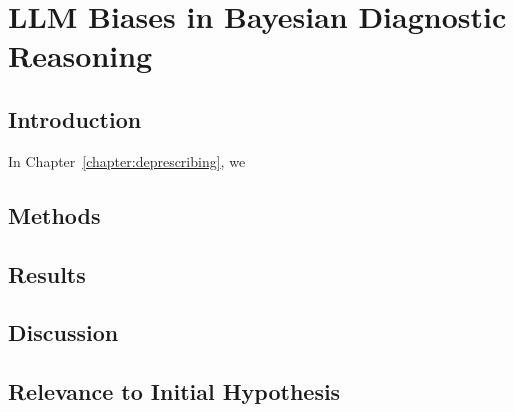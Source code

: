 \chapter{LLM Biases in Bayesian Diagnostic Reasoning} \label{chapter:race-bayes}

\section{Introduction}
In Chapter~\ref{chapter:deprescribing}, we 
\section{Methods}
\section{Results}
\section{Discussion}
\section{Relevance to Initial Hypothesis}
